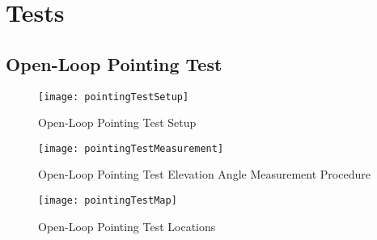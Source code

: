 \chapter{Tests}

\section{Open-Loop Pointing Test}
\begin{figure}[!htb]
  \begin{minipage}{.49\textwidth}
    \centering
    \texttt{[image: pointingTestSetup]}
    \caption{Open-Loop Pointing Test Setup}
    \label{fig:pointingTestSetup}
  \end{minipage}
  \begin{minipage}{.49\textwidth}
    \centering
    \texttt{[image: pointingTestMeasurement]}
    \caption{Open-Loop Pointing Test Elevation Angle Measurement Procedure}
    \label{fig:pointingTestMeasurement}
  \end{minipage}
\end{figure}
\begin{figure}[!htb]
  \centering
  \texttt{[image: pointingTestMap]}
  \caption{Open-Loop Pointing Test Locations}
  \label{fig:pointingTestMap}
\end{figure}
\newpage

